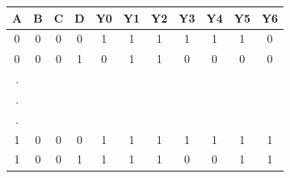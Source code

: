 \begin{table}[H]
  \centering
  \begin{tabular}{c c c c c c c c c c c}
    A & B & C & D & Y0 & Y1 & Y2 & Y3 & Y4 & Y5 & Y6 \\ \hline
    0 & 0 & 0 & 0 &  1 &  1 &  1 &  1 &  1 &  1 &  0 \\
    0 & 0 & 0 & 1 &  0 &  1 &  1 &  0 &  0 &  0 &  0 \\
    . &   &   &   &    &    &    &    &    &    &    \\
    . &   &   &   &    &    &    &    &    &    &    \\
    . &   &   &   &    &    &    &    &    &    &    \\
    1 & 0 & 0 & 0 &  1 &  1 &  1 &  1 &  1 &  1 &  1 \\
    1 & 0 & 0 & 1 &  1 &  1 &  1 &  0 &  0 &  1 &  1
  \end{tabular}
\end{table}
